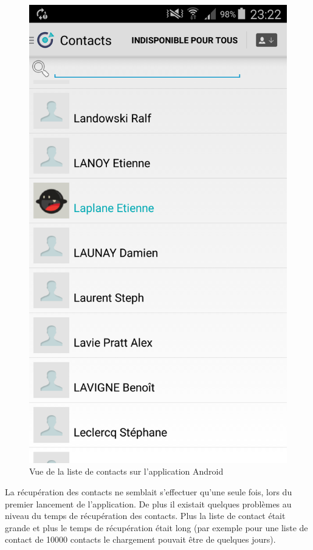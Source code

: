 \begin{figure}[!h]
	\centering
	\includegraphics[scale=0.1]{img/contact.png}
	\caption{\label{contact} {Vue de la liste de contacts sur l'application Android}}
\end{figure}

La récupération des contacts ne semblait s'effectuer qu'une seule fois, lors du premier lancement de l'application. De plus il existait quelques problèmes au niveau du temps de récupération des contacts. Plus la liste de contact était grande et plus le temps de récupération était long (par exemple pour une liste de contact de 10000 contacts le chargement pouvait être de quelques jours).\\

